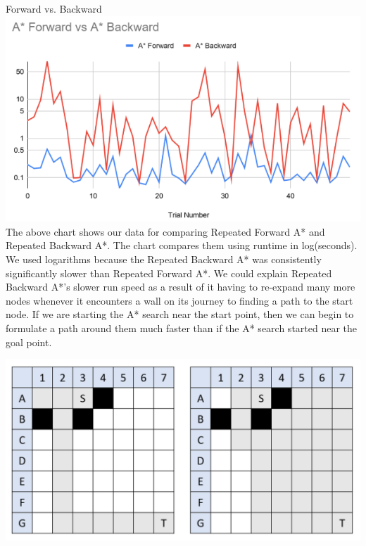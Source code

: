 \documentclass[12pt]{article}
\theoremstyle{definition}
\begin{document}
\begin{onehalfspacing}
\begin{section}{Forward vs. Backward}
\includegraphics[scale=0.9]{images/Forward vs Backward Experiment.png}
The above chart shows our data for comparing Repeated Forward A* and Repeated Backward A*. The chart compares them using runtime in log(seconds). We used logarithms because the Repeated Backward A* was consistently significantly slower than Repeated Forward A*. We could explain Repeated Backward A*'s slower run speed as a result of it having to re-expand many more nodes whenever it encounters a wall on its journey to finding a path to the start node. If we are starting the A* search near the start point, then we can begin to formulate a path around them much faster than if the A* search started near the goal point. \\
\begin{center}\includegraphics[scale=.4]{images/Forward vs Backward Diagram.png}\end{center}
\\

\end{section}
\end{onehalfspacing}
\end{document}

